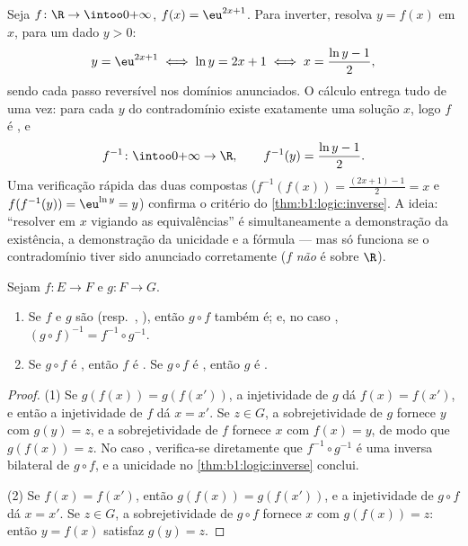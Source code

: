 \begin{example}\label{ex:b1:logic:inversecomp}
Seja $f \colon \R \to \intoo0{+\infty}$, $f(x) = \eu^{2x+1}$. Para
inverter, resolva $y = f(x)$ em $x$, para um dado $y > 0$:
\[
y = \eu^{2x+1} \iff \ln y = 2x + 1 \iff x = \frac{\ln y - 1}2 ,
\]
sendo cada passo reversível nos domínios anunciados. O cálculo entrega
tudo de uma vez: para cada $y$ do contradomínio existe exatamente uma
solução $x$, logo $f$ é , e
\[
f^{-1} \colon \intoo0{+\infty} \to \R,
\qquad
f^{-1}(y) = \frac{\ln y - 1}2 .
\]
Uma verificação rápida das duas compostas ($f^{-1}(f(x)) = \frac{(2x+1) -
1}2 = x$ e $f(f^{-1}(y)) = \eu^{\ln y} = y$) confirma
o critério do \cref{thm:b1:logic:inverse}. A ideia: ``resolver em $x$ vigiando as
equivalências'' é simultaneamente a demonstração da existência, a
demonstração da unicidade e a fórmula --- mas só funciona se o
contradomínio tiver sido anunciado corretamente ($f$ \emph{não} é
 sobre $\R$).
\end{example}

\begin{proposition}\label{prop:b1:logic:comp}
Sejam $f \colon E \to F$ e $g \colon F \to G$.
\begin{enumerate}
  \item Se $f$ e $g$ são  (resp.\ , ),
        então $g \circ f$ também é; e, no caso , $(g \circ f)^{-1} = f^{-1} \circ
        g^{-1}$.
  \item Se $g \circ f$ é , então $f$ é . Se
        $g \circ f$ é , então $g$ é .
\end{enumerate}
\end{proposition}

\begin{proof}
(1) Se $g(f(x)) = g(f(x'))$, a injetividade de $g$ dá $f(x) = f(x')$,
e então a injetividade de $f$ dá $x = x'$. Se $z \in G$, a sobrejetividade
de $g$ fornece $y$ com $g(y) = z$, e a sobrejetividade de $f$ fornece $x$
com $f(x) = y$, de modo que $g(f(x)) = z$. No caso , verifica-se
diretamente que $f^{-1} \circ g^{-1}$ é uma inversa bilateral de $g \circ f$, e a
unicidade no \cref{thm:b1:logic:inverse} conclui.

(2) Se $f(x) = f(x')$, então $g(f(x)) = g(f(x'))$, e a injetividade
de $g \circ f$ dá $x = x'$. Se $z \in G$, a sobrejetividade de $g \circ f$
fornece $x$ com $g(f(x)) = z$: então $y = f(x)$ satisfaz $g(y) = z$.
\end{proof}

